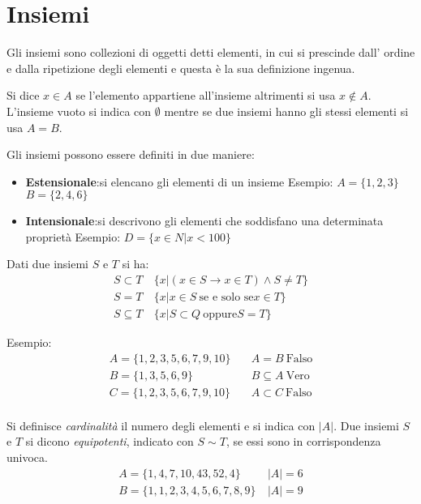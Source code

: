 \chapter{Insiemi}
Gli insiemi sono collezioni di oggetti detti elementi, in cui si prescinde dall'
ordine e dalla ripetizione degli elementi e questa è la sua definizione ingenua.

Si dice $x \in A$ se l'elemento appartiene all'insieme altrimenti si usa $x \not \in A$.
L'insieme vuoto si indica con $\emptyset$ mentre se due insiemi hanno gli stessi elementi si usa $A = B$.

Gli insiemi possono essere definiti in due maniere:
\begin{itemize}
  \item \textbf{Estensionale}:si elencano gli elementi di un insieme\newline
        Esempio:\newline
        $A = \{1,2,3\}$\newline
        $B = \{2,4,6\}$
  \item \textbf{Intensionale}:si descrivono gli elementi che soddisfano una determinata proprietà\newline
        Esempio: \newline
        $D = \{x \in N | x < 100\}$
\end{itemize}

Dati due insiemi $S$ e $T$ si ha:
\begin{align*}
  S \subset T & \ \{x | (x \in S \rightarrow x \in T) \land S \not = T \} \\
  S = T & \  \{x | x \in S \ \text{se e solo se} x \in T \} \\
  S \subseteq T & \ \{x | S \subset Q \ \text{oppure} S = T \}
\end{align*}

Esempio:\newline
\begin{align*}
A = \{1,2,3,5,6,7,9,10 \}  & \quad A = B  \ \text{Falso}\\
B = \{1,3,5,6,9 \}  & \quad B \subseteq A \ \text{Vero}\\
C = \{1,2,3,5,6,7,9,10 \} & \quad A \subset C \ \text{Falso}\\
\end{align*}


Si definisce \textit{cardinalità} il numero degli elementi e si indica con $|A|$.\newline
Due insiemi $S$ e $T$ si dicono \textit{equipotenti}, indicato con $S \sim T$, se
essi sono in corrispondenza univoca.
\begin{align*}
A = \{ 1,4,7,10,43,52,4 \} & \ |A| = 6 \\
B = \{1,1,2,3,4,5,6,7,8,9 \} & \ |A| = 9 \\
\end{align*}


